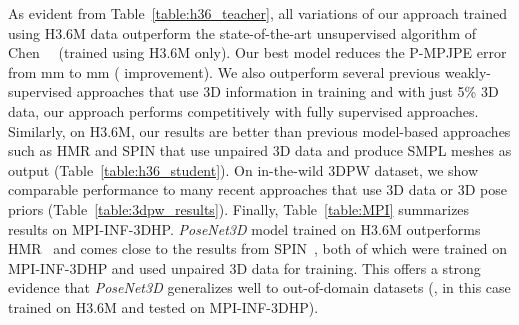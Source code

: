 \documentclass[10pt,twocolumn,letterpaper]{article}
\begin{document}
As evident from Table~\ref{table:h36_teacher}, all variations of our approach trained using H3.6M data outperform the state-of-the-art unsupervised algorithm of Chen~\etal~\cite{chingCVPR2019} (trained using H3.6M only). Our best model reduces the P-MPJPE error from mm to mm ( improvement). We also outperform several previous weakly-supervised approaches that use 3D information in training and with just 5\% 3D data, our approach performs competitively with fully supervised approaches.  Similarly, on H3.6M, our results are better than previous model-based approaches such as HMR and SPIN that use unpaired 3D data and produce SMPL meshes as output (Table~\ref{table:h36_student}). On in-the-wild 3DPW dataset, we show comparable performance to many recent approaches that use 3D data or 3D pose priors (Table~\ref{table:3dpw_results}). Finally, Table~\ref{table:MPI} summarizes results on MPI-INF-3DHP. \textit{PoseNet3D} model trained on H3.6M outperforms HMR~\cite{kanazawa2018end} and comes close to the results from SPIN~\cite{SPIN_ICCV2019}, both of which were trained on MPI-INF-3DHP and used unpaired 3D data for training. This offers a strong evidence that \textit{PoseNet3D} generalizes well to out-of-domain datasets (\eg, in this case trained on H3.6M and tested on MPI-INF-3DHP).
\end{document}
